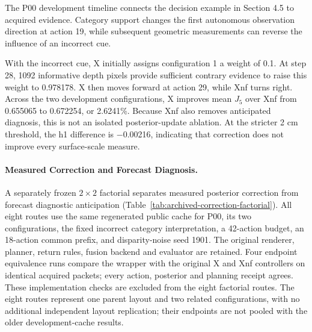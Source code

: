 The P00 development timeline connects the decision example in Section 4.5 to acquired evidence. Category support changes the first autonomous observation direction at action 19, while subsequent geometric measurements can reverse the influence of an incorrect cue.

With the incorrect cue, X initially assigns configuration 1 a weight of 0.1. At step 28, 1092 informative depth pixels provide sufficient contrary evidence to raise this weight to 0.978178. X then moves forward at action 29, while Xnf turns right. Across the two development configurations, X improves mean \(J_5\) over Xnf from 0.655065 to 0.672254, or 2.6241\%. Because Xnf also removes anticipated diagnosis, this is not an isolated posterior-update ablation. At the stricter 2 cm threshold, the h1 difference is \ensuremath{-}0.00216, indicating that correction does not improve every surface-scale measure.




\paragraph{Measured Correction and Forecast Diagnosis.}
A separately frozen $2\times2$ factorial separates measured posterior correction from forecast diagnostic anticipation (Table~\ref{tab:archived-correction-factorial}). All eight routes use the same regenerated public cache for P00, its two configurations, the fixed incorrect category interpretation, a 42-action budget, an 18-action common prefix, and disparity-noise seed 1901. The original renderer, planner, return rules, fusion backend and evaluator are retained. Four endpoint equivalence runs compare the wrapper with the original X and Xnf controllers on identical acquired packets; every action, posterior and planning receipt agrees. These implementation checks are excluded from the eight factorial routes. The eight routes represent one parent layout and two related configurations, with no additional independent layout replication; their endpoints are not pooled with the older development-cache results.


